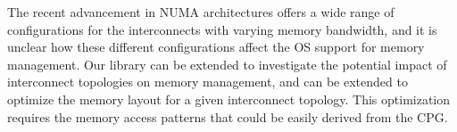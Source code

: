  The recent advancement in NUMA architectures offers a wide range of configurations for the interconnects with varying memory bandwidth, and  it is unclear how these different configurations affect the OS support for memory management. Our library can be extended to investigate the potential impact of interconnect topologies on memory management, and can be extended to  optimize the memory layout for a given interconnect topology. This optimization requires the memory access patterns that could be easily derived from the CPG.


